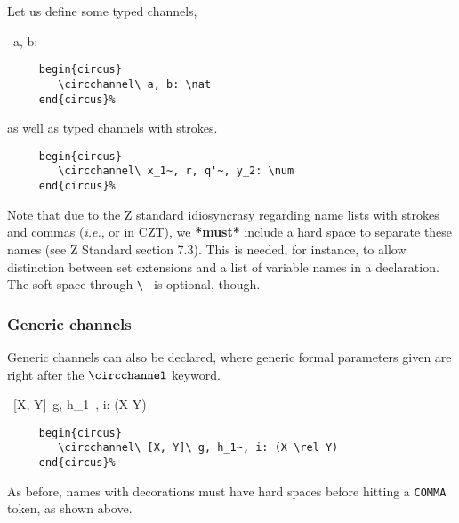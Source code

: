 \documentclass{article}
\begin{document}
Let us define some typed channels,
%
\begin{circus}
  \circchannel\ a, b: \nat
\end{circus}%
%
\begin{verbatim}
     begin{circus}
        \circchannel\ a, b: \nat
     end{circus}%
\end{verbatim}
%
as well as typed channels with strokes.
%
%
%
\begin{verbatim}
     begin{circus}
        \circchannel\ x_1~, r, q'~, y_2: \num
     end{circus}%
\end{verbatim}
%
Note that due to the Z standard idiosyncrasy regarding name lists with strokes
and commas (\textit{i.e.},  or  in CZT),
we \textbf{*must*} include a hard space to separate these names (see Z Standard
section 7.3). This is needed, for instance, to allow distinction between set
extensions and a list of variable names in a declaration. The soft space
through \verb'\ ' is optional, though.

\subsubsection{Generic channels}

Generic channels can also be declared, where generic formal parameters given
are right after the $\circchannel$ keyword.
%
\begin{circus}
   \circchannel\ [X, Y]\ g, h_1~, i: (X \rel Y)
\end{circus}%
%
\begin{verbatim}
     begin{circus}
        \circchannel\ [X, Y]\ g, h_1~, i: (X \rel Y)
     end{circus}%
\end{verbatim}
%
As before, names with decorations must have hard spaces before hitting a
\texttt{COMMA} token, as shown above.
\end{document}
